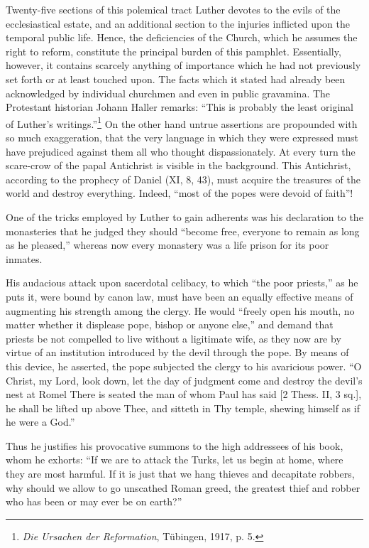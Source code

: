 Twenty-five sections of this polemical tract Luther devotes to
the evils of the ecclesiastical estate, and an additional section to the
injuries inflicted upon the temporal public life. Hence, the deficiencies
of the Church, which he assumes the right to reform, constitute the
principal burden of this pamphlet. Essentially, however, it contains
scarcely anything of importance which he had not previously set
forth or at least touched upon. The facts which it stated had already
been acknowledged by individual churchmen and even in public
gravamina. The Protestant historian Johann Haller remarks: “This
is probably the least original of Luther’s writings.”\footnote
{\textit{Die Ursachen der Reformation}, Tübingen, 1917, p. 5.}
On the other
hand untrue assertions are propounded with so much exaggeration,
that the very language in which they were expressed must have prejudiced
against them all who thought dispassionately. At every turn
the scare-crow of the papal Antichrist is visible in the background.
This Antichrist, according to the prophecy of Daniel (XI, 8, 43),
must acquire the treasures of the world and destroy everything. Indeed,
“most of the popes were devoid of faith”!

One of the tricks employed by Luther to gain adherents was his declaration
to the monasteries that he judged they should “become free, everyone
to remain as long as he pleased,” whereas now every monastery was a life
prison for its poor inmates.

His audacious attack upon sacerdotal celibacy, to which “the poor
priests,” as he puts it, were bound by canon law, must have been an equally
effective means of augmenting his strength among the clergy. He would
“freely open his mouth, no matter whether it displease pope, bishop or anyone
else,” and demand that priests be not compelled to live without a ligitimate
wife, as they now are by virtue of an institution introduced by the devil
through the pope. By means of this device, he asserted, the pope subjected
the clergy to his avaricious power. “O Christ, my Lord, look down, let the
day of judgment come and destroy the devil’s nest at Romel There is seated
the man of whom Paul has said [2 Thess. II, 3 sq.], he shall be lifted up
above Thee, and sitteth in Thy temple, shewing himself as if he were a
God.”

Thus he justifies his provocative summons to the high addressees of his
book, whom he exhorts: “If we are to attack the Turks, let us begin at
home, where they are most harmful. If it is just that we hang thieves and
decapitate robbers, why should we allow to go unscathed Roman greed,
the greatest thief and robber who has been or may ever be on earth?”

